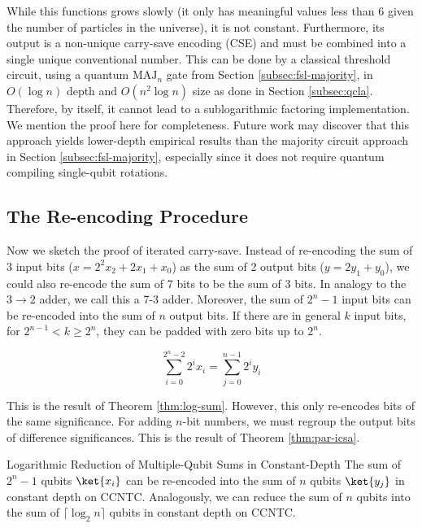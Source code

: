 While this functions grows
slowly (it only has meaningful values less than
$6$ given the number of particles in the universe), it is not
constant. Furthermore, its output is a non-unique carry-save encoding (CSE)
and must be combined into a single unique conventional number.
This can be done by a classical threshold circuit, using a quantum $\text{MAJ}_n$
gate from Section \ref{subsec:fsl-majority},  in
$O(\log n)$ depth and $O(n^2 \log n)$ size as done in Section \ref{subsec:qcla}.
Therefore, by itself, it cannot lead to a sublogarithmic factoring
implementation.
We mention the proof here for completeness. Future work
may discover that this approach yields lower-depth empirical
results than the majority circuit approach in Section \ref{subsec:fsl-majority},
especially since it does not require quantum compiling single-qubit rotations.

\subsection{The Re-encoding Procedure}
Now we sketch the proof of iterated carry-save.
Instead of re-encoding the sum of 3 input bits ($x = 2^2 x_2 + 2 x_1  + x_0$)
as the sum of 2 output bits ($y = 2 y_1 + y_0$),
we could also re-encode the sum of 7 bits to be the
sum of 3 bits. In analogy to the $3 \rightarrow 2$ adder, we call this a 7-3 adder.
Moreover, the sum of $2^n - 1$ input bits can be re-encoded into the sum
of $n$ output bits. If there are in general $k$ input bits, for $2^{n-1} < k \ge 2^n$,
they can be padded with zero bits up to $2^n$.

\begin{equation}
\sum_{i=0}^{2^n - 2} 2^i x_i = \sum_{j=0}^{n-1} 2^i y_i
\end{equation}

This is the result of Theorem \ref{thm:log-sum}.
However, this only re-encodes bits of the same significance. For adding
$n$-bit numbers, we must regroup the output bits of difference
significances. This is the result of Theorem \ref{thm:par-icsa}.

\begin{theorem}{Logarithmic Reduction of Multiple-Qubit Sums in Constant-Depth}
The sum of $2^n -1$ qubits $\ket{x_i}$
can be re-encoded into the sum of $n$ qubits $\ket{y_j}$ in
constant depth on CCNTC. Analogously, we can reduce the sum of
$n$ qubits into the sum of $\lceil \log_2 n \rceil$ qubits in
constant depth on CCNTC.
\label{thm:log-sum}
\end{theorem}

